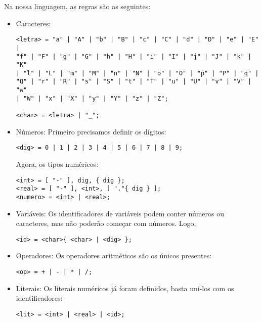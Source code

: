 \documentclass[a4 paper, 12pt]{article}
\begin{document}
Na nossa linguagem, as regras s\~ao as seguintes:
\begin{itemize}
\item Caracteres:
\begin{verbatim}
<letra> = "a" | "A" | "b" | "B" | "c" | "C" | "d" | "D" | "e" | "E" |
"f" | "F" | "g" | "G" | "h" | "H" | "i" | "I" | "j" | "J" | "k" | "K"
| "l" | "L" | "m" | "M" | "n" | "N" | "o" | "O" | "p" | "P" | "q" |
"Q" | "r" | "R" | "s" | "S" | "t" | "T" | "u" | "U" | "v" | "V" | "w"
| "W" | "x" | "X" | "y" | "Y" | "z" | "Z";

<char> = <letra> | "_";
\end{verbatim}

\item N\'umeros:
Primeiro precisamos definir os d\'igitos:
\begin{verbatim}
<dig> = 0 | 1 | 2 | 3 | 4 | 5 | 6 | 7 | 8 | 9;
\end{verbatim}

Agora, os tipos num\'ericos:

\begin{verbatim}
<int> = [ "-" ], dig, { dig };
<real> = [ "-" ], <int>, [ "."{ dig } ];
<numero> = <int> | <real>;
\end{verbatim}

\item Vari\'aveis:
Os identificadores de vari\'aveis podem conter n\'umeros ou
caracteres, mas n\~ao poder\~ao come\c car com n\'umeros. Logo,
\begin{verbatim}
<id> = <char>{ <char> | <dig> };
\end{verbatim}

\item Operadores:
Os operadores aritm\'eticos s\~ao os \'unicos presentes:
\begin{verbatim}
<op> = + | - | * | /;
\end{verbatim}

\item Literais:
Os literais num\'ericos j\'a foram definidos, basta un\'i-los com os
identificadores:
\begin{verbatim}
<lit> = <int> | <real> | <id>;
\end{verbatim}
\end{itemize}
\end{document}
